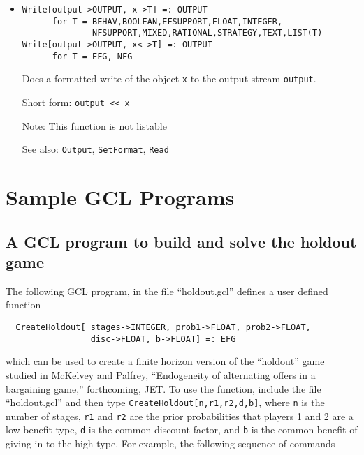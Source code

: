 \begin{itemize}
\item
\protect \large \begin{verbatim}
Write[output->OUTPUT, x->T] =: OUTPUT  
      for T = BEHAV,BOOLEAN,EFSUPPORT,FLOAT,INTEGER,
              NFSUPPORT,MIXED,RATIONAL,STRATEGY,TEXT,LIST(T)
Write[output->OUTPUT, x<->T] =: OUTPUT 
      for T = EFG, NFG
\end{verbatim}\normalsize

\bd
Does a formatted write of the object \verb+x+ to the
output stream \verb+output+.
\item
[Short form:] \verb+output << x+
\item
[Note:] This function is not listable
\item
[See also:] {\tt Output}, {\tt SetFormat}, {\tt Read}
\ed




\end{itemize}

\newpage
\section{Sample GCL Programs}

\subsection{A GCL program to build and solve the holdout game}

The following GCL program, in the file ``holdout.gcl'' defines a user
defined function

\begin{verbatim}
  CreateHoldout[ stages->INTEGER, prob1->FLOAT, prob2->FLOAT, 
                 disc->FLOAT, b->FLOAT] =: EFG
\end{verbatim}

\noindent
which can be used to create a finite horizon version of the
``holdout'' game studied in McKelvey and Palfrey, ``Endogeneity of
alternating offers in a bargaining game,'' forthcoming, JET.  To use
the function, include the file ``holdout.gcl'' and then type
\verb+CreateHoldout[n,r1,r2,d,b]+, where \verb+n+ is the number of
stages, \verb+r1+ and \verb+r2+ are the prior probabilities that
players 1 and 2 are a low benefit type, \verb+d+ is the common
discount factor, and \verb+b+ is the common benefit of giving in to
the high type.  For example, the following sequence of commands

